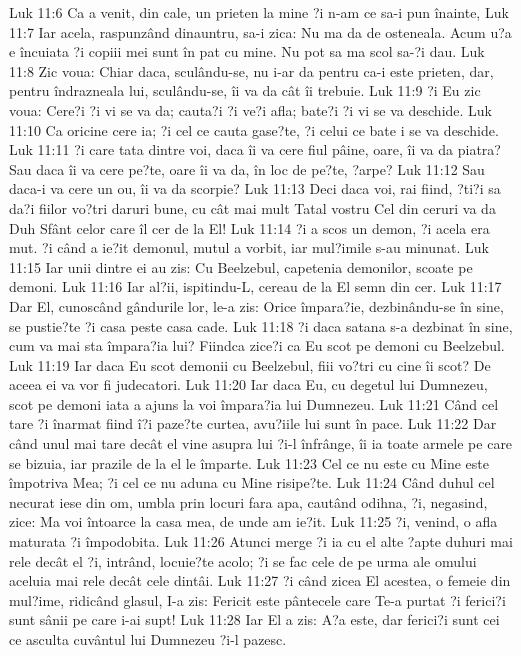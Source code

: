 Luk 11:6  Ca a venit, din cale, un prieten la mine ?i n-am ce sa-i pun înainte,
Luk 11:7  Iar acela, raspunzând dinauntru, sa-i zica: Nu ma da de osteneala. Acum u?a e încuiata ?i copiii mei sunt în pat cu mine. Nu pot sa ma scol sa-?i dau.
Luk 11:8  Zic voua: Chiar daca, sculându-se, nu i-ar da pentru ca-i este prieten, dar, pentru îndrazneala lui, sculându-se, îi va da cât îi trebuie.
Luk 11:9  ?i Eu zic voua: Cere?i ?i vi se va da; cauta?i ?i ve?i afla; bate?i ?i vi se va deschide.
Luk 11:10  Ca oricine cere ia; ?i cel ce cauta gase?te, ?i celui ce bate i se va deschide.
Luk 11:11  ?i care tata dintre voi, daca îi va cere fiul pâine, oare, îi va da piatra? Sau daca îi va cere pe?te, oare îi va da, în loc de pe?te, ?arpe?
Luk 11:12  Sau daca-i va cere un ou, îi va da scorpie?
Luk 11:13  Deci daca voi, rai fiind, ?ti?i sa da?i fiilor vo?tri daruri bune, cu cât mai mult Tatal vostru Cel din ceruri va da Duh Sfânt celor care îl cer de la El!
Luk 11:14  ?i a scos un demon, ?i acela era mut. ?i când a ie?it demonul, mutul a vorbit, iar mul?imile s-au minunat.
Luk 11:15  Iar unii dintre ei au zis: Cu Beelzebul, capetenia demonilor, scoate pe demoni.
Luk 11:16  Iar al?ii, ispitindu-L, cereau de la El semn din cer.
Luk 11:17  Dar El, cunoscând gândurile lor, le-a zis: Orice împara?ie, dezbinându-se în sine, se pustie?te ?i casa peste casa cade.
Luk 11:18  ?i daca satana s-a dezbinat în sine, cum va mai sta împara?ia lui? Fiindca zice?i ca Eu scot pe demoni cu Beelzebul.
Luk 11:19  Iar daca Eu scot demonii cu Beelzebul, fiii vo?tri cu cine îi scot? De aceea ei va vor fi judecatori.
Luk 11:20  Iar daca Eu, cu degetul lui Dumnezeu, scot pe demoni iata a ajuns la voi împara?ia lui Dumnezeu.
Luk 11:21  Când cel tare ?i înarmat fiind î?i paze?te curtea, avu?iile lui sunt în pace.
Luk 11:22  Dar când unul mai tare decât el vine asupra lui ?i-l înfrânge, îi ia toate armele pe care se bizuia, iar prazile de la el le împarte.
Luk 11:23  Cel ce nu este cu Mine este împotriva Mea; ?i cel ce nu aduna cu Mine risipe?te.
Luk 11:24  Când duhul cel necurat iese din om, umbla prin locuri fara apa, cautând odihna, ?i, negasind, zice: Ma voi întoarce la casa mea, de unde am ie?it.
Luk 11:25  ?i, venind, o afla maturata ?i împodobita.
Luk 11:26  Atunci merge ?i ia cu el alte ?apte duhuri mai rele decât el ?i, intrând, locuie?te acolo; ?i se fac cele de pe urma ale omului aceluia mai rele decât cele dintâi.
Luk 11:27  ?i când zicea El acestea, o femeie din mul?ime, ridicând glasul, I-a zis: Fericit este pântecele care Te-a purtat ?i ferici?i sunt sânii pe care i-ai supt!
Luk 11:28  Iar El a zis: A?a este, dar ferici?i sunt cei ce asculta cuvântul lui Dumnezeu ?i-l pazesc.
